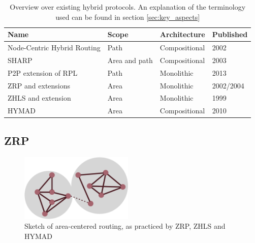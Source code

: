 \documentclass[a4paper,10pt]{scrartcl}
\begin{document}
\begin{table}[t]
    \begin{tabular}{p{}|l|l|l}
        Name & Scope & Architecture & Published \\
        \hline
        Node-Centric Hybrid Routing \cite{Roy_nodecentric} & Path & Compositional & 2002 \\ %
        SHARP\cite{SHARP} & Area and path & Compositional & 2003 \\ %
        P2P extension\cite{RFC-6997} of RPL\cite{RFC-6550} & Path & Monolithic & 2013\\
        ZRP \cite{ZRP-Draft} and extensions \cite{TZRP} \cite{IZR} \cite{WARP} & Area & Monolithic & 2002/2004\\
        ZHLS\cite{ZHLS} and extension \cite{ZHLS-GF} & Area & Monolithic & 1999\\
        HYMAD\cite{HYMAD} & Area & Compositional & 2010\\ %
    \end{tabular}
    \caption{Overview over existing hybrid protocols. An explanation of the terminology used can be found in section \ref{sec:key_aspects}}
    \label{fig:overview}
\end{table}


\subsection{\gls{ZRP}}
\label{subsec:zrp}

\begin{figure}
  \begin{center}
    \includegraphics[width=0.48\textwidth]{../images/ZRP}
  \end{center}
  \caption{Sketch of area-centered routing, as practiced by ZRP, ZHLS and HYMAD}
  \label{fig:zrp_area_centered}
\end{figure}
\end{document}
